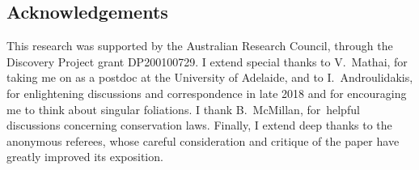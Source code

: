 \documentclass[pdftex]{sigma}
\numberwithin{equation}{section}
\begin{document}
\subsection*{Acknowledgements}

This research was supported by the Australian Research Council, through the Discovery Project grant DP200100729. I extend special thanks to V.~Mathai, for taking me on as a postdoc at the University of Adelaide, and to I.~Androulidakis, for enlightening discussions and correspondence in late 2018 and for encouraging me to think about singular foliations. I thank B.~McMillan, for~helpful discussions concerning conservation laws. Finally, I extend deep thanks to the anonymous referees, whose careful consideration and critique of the paper have greatly improved its exposition.

\end{document}
